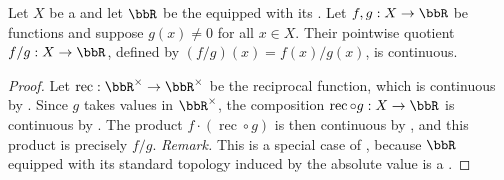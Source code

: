 \begin{proposition} \label{proposition:continuity_of_pointwise_quotient_of_continuous_real_valued_functions}
    Let $X$ be a  and let $\bbR$ be the  equipped with its . Let $f,g : X \to \bbR$ be  functions and suppose $g(x) \neq 0$ for all $x \in X$. Their pointwise quotient $f/g : X \to \bbR$, defined by $(f/g)(x) = f(x) / g(x)$, is continuous.
\end{proposition}
\begin{proof}
    Let $\operatorname{rec} : \bbR^\times \to \bbR^\times$ be the reciprocal function, which is continuous by . Since $g$ takes values in $\bbR^\times$, the composition $\operatorname{rec} \circ g : X \to \bbR$ is continuous by . The product $f \cdot (\operatorname{rec} \circ g)$ is then continuous by , and this product is precisely $f/g$.
    \medskip
    \noindent\textit{Remark.} This is a special case of , because $\bbR$ equipped with its standard topology induced by the absolute value is a .
\end{proof}